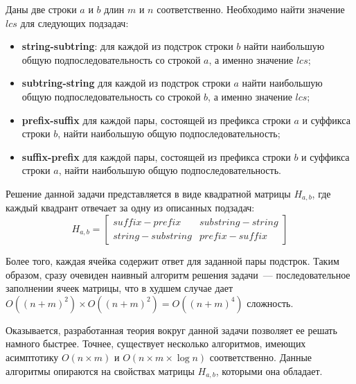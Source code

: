 Даны две строки $a$ и $b$ длин $m$ и $n$ соответственно. 
Необходимо найти значение $lcs$ для следующих подзадач:
\begin{itemize}
    \item \textbf{string-subtring}: для каждой из подстрок строки $b$ найти наибольшую общую подпоследовательность со строкой $a$, а именно значение $lcs$;
    \item \textbf{subtring-string} для каждой из подстрок строки $a$ найти наибольшую общую подпоследовательность со строкой $b$, а именно значение $lcs$;
    \item \textbf{prefix-suffix} для каждой пары, состоящей из префикса строки $a$ и суффикса строки $b$, найти наибольшую общую подпоследовательность;
    \item \textbf{suffix-prefix} для каждой пары, состоящей из префикса строки $b$ и суффикса строки $a$, найти наибольшую общую подпоследовательность.
\end{itemize}

Решение данной задачи представляется в виде квадратной матрицы $H_{a,b}$, где каждый квадрант отвечает за одну из описанных подзадач: 
\begin{equation}
 H_{a,b} = \begin{bmatrix}
suffix-prefix & substring-string \\
string-substring & prefix-suffix 
\end{bmatrix}    
\end{equation}

Более того, каждая ячейка содержит ответ для заданной пары подстрок.
Таким образом, сразу очевиден наивный алгоритм решения  задачи~--- последовательное  заполнении ячеек матрицы, что в худшем случае дает $O((n+m)^2) \times O((n+m)^2) = O((n+ m)^4)  $ сложность.

Оказывается, разработанная теория вокруг  данной задачи позволяет ее решать намного быстрее.
Точнее, существует несколько алгоритмов, имеющих асимптотику $O(n \times m)$ и $O(n \times m \times \log n)$ соответственно.
Данные алгоритмы опираются на свойствах матрицы $H_{a,b}$, которыми она обладает.



